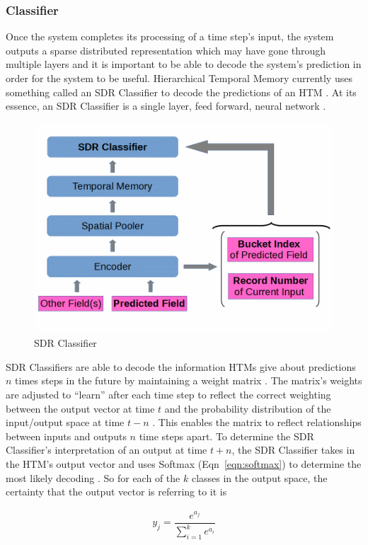 \documentclass[oneside,12pt,openany]{book}
\begin{document}
	\subsubsection{Classifier}
	
	Once the system completes its processing of a time step's input, the system outputs a sparse distributed representation which may have gone through multiple layers and it is important to be able to decode the system's prediction in order for the system to be useful. Hierarchical Temporal Memory currently uses something called an SDR Classifier to decode the predictions of an HTM \cite{Dillon}. At its essence, an SDR Classifier is a single layer, feed forward, neural network \cite{Dillon}.
	
	\begin{figure}[!ht]
		\centering
		\includegraphics[width=.6\linewidth]{images/SDRClassifier.jpg}
		\caption{SDR Classifier}
		\label{fig:SDRClassifier}
	\end{figure}
	
	SDR Classifiers are able to decode the information HTMs give about predictions $n$ times steps in the future by maintaining a weight matrix \cite{Dillon}. The matrix's weights are adjusted to ``learn'' after each time step to reflect the correct weighting between the output vector at time $t$ and the probability distribution of the input/output space at time $t-n$ \cite{Dillon}. This enables the matrix to reflect relationships between inputs and outputs $n$ time steps apart. To determine the SDR Classifier's interpretation of an output at time $t+n$, the SDR Classifier takes in the HTM's output vector and uses Softmax (Eqn~\ref{eqn:softmax}) to determine the most likely decoding \cite{Dillon}. So for each of the $k$ classes in the output space, the certainty that the output vector is referring to it is 
	
	\begin{align}
	\label{eqn:softmax}
	y_{j} = \dfrac{e^{a_{j}}}{\sum_{i=1}^{k} e^{a_{i}}}
	\end{align}
	
\end{document}
